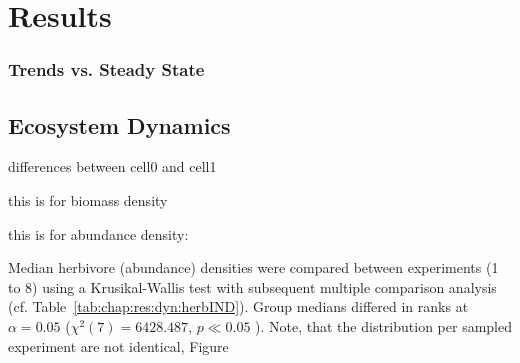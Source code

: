 \chapter{Results}
\label{chap:res}


\subsection{Trends vs. Steady State}
\label{chap:res:dyn:trend}

\section{Ecosystem Dynamics}
\label{chap:res:dyn} 
differences between cell0 and cell1


this is for biomass density


this is for abundance density:

Median herbivore (abundance) densities were compared between experiments (1 to 8) using a Krusikal-Wallis test with subsequent multiple comparison analysis (cf. Table~\ref{tab:chap:res:dyn:herbIND}). Group medians differed in ranks at $\alpha = 0.05$ ($\chi^{2}(7) = 6428.487$, $p \ll 0.05$ 
).
Note, that the distribution per sampled experiment are not identical,  Figure 



%
%